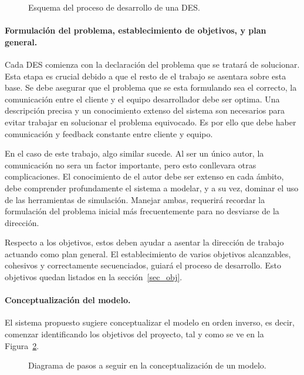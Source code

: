 \begin{figure}
	\begin{center}
		
	\end{center}
	\caption{Esquema del proceso de desarrollo de una DES.}
	\label{fig:2_fc_sim_cookbook}
\end{figure}

\paragraph{Formulación del problema, establecimiento de objetivos, y plan general.}

Cada DES comienza con la declaración del problema que se tratará de solucionar.
Esta etapa es crucial debido a que el resto de el trabajo se asentara sobre esta base.
Se debe asegurar que el problema que se esta formulando sea el correcto,
la comunicación entre el cliente y el equipo desarrollador debe ser optima.
Una descripción precisa y un conocimiento extenso del sistema son necesarios para evitar
trabajar en solucionar el problema equivocado.
Es por ello que debe haber comunicación y feedback constante entre cliente y equipo.

En el caso de este trabajo, algo similar sucede.
Al ser un único autor, la comunicación no sera un factor importante,
pero esto conllevara otras complicaciones.
El conocimiento de el autor debe ser extenso en cada ámbito,
debe comprender profundamente el sistema a modelar, y a su vez,
dominar el uso de las herramientas de simulación.
Manejar ambas, requerirá recordar la formulación del problema inicial
más frecuentemente para no desviarse de la dirección.

Respecto a los objetivos, estos deben ayudar a asentar la dirección de trabajo actuando como plan general.
El establecimiento de varios objetivos alcanzables, cohesivos y correctamente secuenciados,
guiará el proceso de desarrollo.
Esto objetivos quedan listados en la sección~\ref{sec_obj}.

\paragraph{Conceptualización del modelo.}

El sistema propuesto sugiere conceptualizar el modelo en orden inverso,
es decir, comenzar identificando los objetivos del proyecto,
tal y como se ve en la Figura~\ref{fig:2_fc_model_concept}.

\begin{figure}[h]
	\begin{center}
		
	\end{center}
	\caption{Diagrama de pasos a seguir en la conceptualización de un modelo.}
	\label{fig:2_fc_model_concept}
\end{figure}


